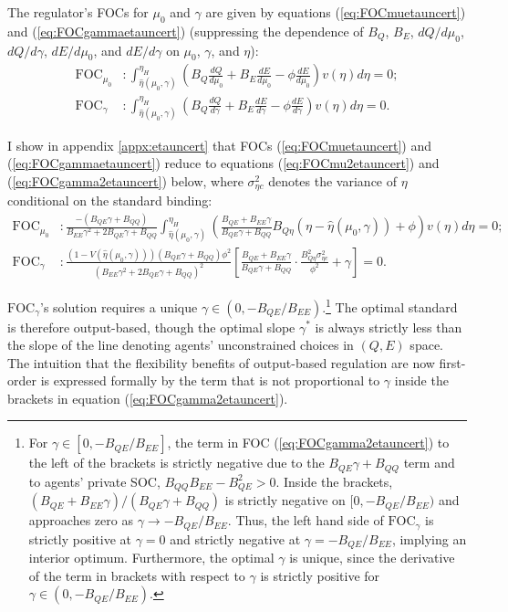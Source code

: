 \documentclass[12pt]{article}
\begin{document}
The regulator's FOCs for $\mu_0$ and $\gamma$ are given by equations (\ref{eq:FOCmuetauncert}) and (\ref{eq:FOCgammaetauncert}) (suppressing the dependence of $B_Q$, $B_E$, $dQ/d\mu_0$, $dQ/d\gamma$, $dE/d\mu_0$, and $dE/d\gamma$ on $\mu_0$, $\gamma$, and $\eta$):
\begin{align}
\text{FOC}_{\mu_0}&:\int_{\hat{\eta}(\mu_0,\gamma)}^{\eta_H}\left(B_Q\frac{dQ}{d\mu_0} +B_E\frac{dE}{d\mu_0} -\phi\frac{dE}{d\mu_0}\right)v(\eta)d\eta = 0; \label{eq:FOCmuetauncert} \\
\text{FOC}_{\gamma}&:\int_{\hat{\eta}(\mu_0,\gamma)}^{\eta_H}\left(B_Q\frac{dQ}{d\gamma} +B_E\frac{dE}{d\gamma} -\phi\frac{dE}{d\gamma}\right)v(\eta)d\eta = 0. \label{eq:FOCgammaetauncert}
\end{align}

I show in appendix \ref{appx:etauncert} that FOCs (\ref{eq:FOCmuetauncert}) and (\ref{eq:FOCgammaetauncert}) reduce to equations (\ref{eq:FOCmu2etauncert}) and (\ref{eq:FOCgamma2etauncert}) below, where $\sigma_{\eta c}^2$ denotes the variance of $\eta$ conditional on the standard binding:
\begin{align}
\text{FOC}_{\mu_0}&:\frac{-(B_{QE}\gamma+B_{QQ})}{B_{EE}\gamma^2+2B_{QE}\gamma+B_{QQ}} \int_{\hat{\eta}(\mu_0,\gamma)}^{\eta_H}\left(\frac{B_{QE}+B_{EE}\gamma}{B_{QE}\gamma+B_{QQ}} B_{Q\eta}(\eta-\hat{\eta}(\mu_0,\gamma))+\phi\right)v(\eta)d\eta=0; \label{eq:FOCmu2etauncert} \\
\text{FOC}_{\gamma}&:\frac{(1-V(\hat{\eta}(\mu_0,\gamma)))(B_{QE}\gamma+B_{QQ})\phi^2} {(B_{EE}\gamma^2+2B_{QE}\gamma+B_{QQ})^2}\left[\frac{B_{QE}+B_{EE}\gamma}{B_{QE}\gamma+B_{QQ}}\cdot \frac{B_{Q\eta}^2\sigma_{\eta c}^2}{\phi^2}+\gamma\right]=0. \label{eq:FOCgamma2etauncert}
\end{align}

$\text{FOC}_{\gamma}$'s solution requires a unique $\gamma\in(0,-B_{QE}/B_{EE})$.\footnote{For $\gamma\in[0,-B_{QE}/B_{EE}]$, the term in FOC (\ref{eq:FOCgamma2etauncert}) to the left of the brackets is strictly negative due to the $B_{QE}\gamma+B_{QQ}$ term and to agents' private SOC, $B_{QQ}B_{EE}-B_{QE}^2>0$. Inside the brackets, $(B_{QE}+B_{EE}\gamma)/(B_{QE}\gamma+B_{QQ})$ is strictly negative on $[0,-B_{QE}/B_{EE})$ and approaches zero as $\gamma\to-B_{QE}/B_{EE}$. Thus, the left hand side of $\text{FOC}_{\gamma}$ is strictly positive at $\gamma=0$ and strictly negative at $\gamma=-B_{QE}/B_{EE}$, implying an interior optimum. Furthermore, the optimal $\gamma$ is unique, since the derivative of the term in brackets with respect to $\gamma$ is strictly positive for $\gamma\in(0,-B_{QE}/B_{EE})$.\label{fn:unqiuegamma}} The optimal standard is therefore output-based, though the optimal slope $\gamma^*$ is always strictly less than the slope of the line denoting agents' unconstrained choices in $(Q,E)$ space. The intuition that the flexibility benefits of output-based regulation are now first-order is expressed formally by the term that is not proportional to $\gamma$ inside the brackets in equation (\ref{eq:FOCgamma2etauncert}).
\end{document}
